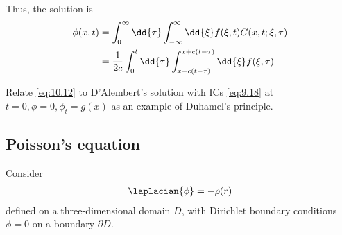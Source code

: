 Thus, the solution is
\begin{align} \label{eq:10.12}
	\phi(x,t) &= \int_0^\infty \dd{\tau} \int_{-\infty}^\infty \dd{\xi} f(\xi, t) G(x,t;\xi,\tau) \notag \\
	&= \frac{1}{2c} \int_0^t \dd{\tau} \int_{x - c(t-\tau)}^{x + c(t - \tau)} \dd{\xi} f(\xi, \tau)
\end{align}

\begin{exercise}
	Relate \cref{eq:10.12} to D'Alembert's solution with ICs \cref{eq:9.18} at $t = 0, \phi = 0, \phi_t = g(x)$ as an example of Duhamel's principle.
\end{exercise}

\subsection{Poisson's equation}
Consider
\begin{align} \label{eq:10.13}
	\laplacian{\phi} = - \rho(r)
\end{align}
defined on a three-dimensional domain $D$, with Dirichlet boundary conditions $\phi = 0$ on a boundary $\partial D$.

